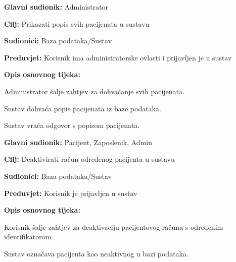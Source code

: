 \noindent {}
\begin{packed_item}
	
	\item \textbf{Glavni sudionik: }Administrator
	\item  \textbf{Cilj:} Prikazati popis svih pacijenata u sustavu
	\item  \textbf{Sudionici:} Baza podataka/Sustav
	\item  \textbf{Preduvjet:} Korisnik ima administratorske ovlasti i prijavljen je u sustav
	\item  \textbf{Opis osnovnog tijeka:}
	
	\item[] \begin{packed_enum}
		
		\item Administrator šalje zahtjev za dohvaćanje svih pacijenata.
		\item Sustav dohvaća popis pacijenata iz baze podataka.
		\item Sustav vraća odgovor s popisom pacijenata.
		
	\end{packed_enum}
	
	
\end{packed_item}

\noindent {}
\begin{packed_item}
	
	\item \textbf{Glavni sudionik: }Pacijent, Zaposlenik, Admin
	\item  \textbf{Cilj:} Deaktivirati račun određenog pacijenta u sustavu
	\item  \textbf{Sudionici:} Baza podataka/Sustav
	\item  \textbf{Preduvjet:} Korisnik je prijavljen u sustav
	\item  \textbf{Opis osnovnog tijeka:}
	
	\item[] \begin{packed_enum}
		
		\item Korisnik šalje zahtjev za deaktivaciju pacijentovog računa s određenim identifikatorom.
		\item Sustav označava pacijenta kao neaktivnog u bazi podataka.
		
	\end{packed_enum}
	
	
\end{packed_item}

